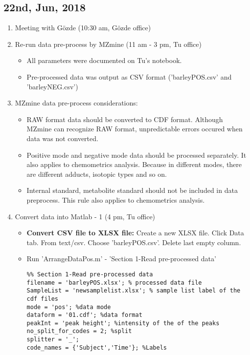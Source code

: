 \subsection{22nd, Jun, 2018}

\begin{enumerate}
    \item Meeting with Gözde (10:30 am, Gözde office)
    \item Re-run data pre-process by MZmine (11 am - 3 pm, Tu office)
        \begin{itemize}
            \item All parameters were documented on Tu's notebook.
            \item Pre-processed data was output as CSV format ('barleyPOS.csv' and 'barleyNEG.csv')
        \end{itemize}
    \item MZmine data pre-process considerations:
        \begin{itemize}
            \item RAW format data should be converted to CDF format. Although MZmine can recognize RAW format, unpredictable errors occured when data was not converted.
            \item Positive mode and negative mode data should be processed separately. It also applies to chemometrics analysis. Because in different modes, there are different adducts, isotopic types and so on.
            \item Internal standard, metabolite standard should not be included in data preprocess. This rule also applies to chemometrics analysis.
        \end{itemize}
    \item Convert data into Matlab - 1 (4 pm, Tu office)
        \begin{itemize}
            \item \textbf{Convert CSV file to XLSX file:} Create a new XLSX file. Click Data tab. From text/csv. Choose 'barleyPOS.csv'. Delete last empty column.
            \item Run 'ArrangeDataPos.m' - 'Section 1-Read pre-processed data'

\begin{lstlisting}
%% Section 1-Read pre-processed data
filename = 'barleyPOS.xlsx'; % processed data file
SampleList = 'newsamplelist.xlsx'; % sample list label of the cdf files
mode = 'pos'; %data mode
dataform = '01.cdf'; %data format 
peakInt = 'peak height'; %intensity of the of the peaks
no_split_for_codes = 2; %split
splitter = '_';
code_names = {'Subject','Time'}; %Labels       
\end{lstlisting}


\end{itemize}
\end{enumerate}
